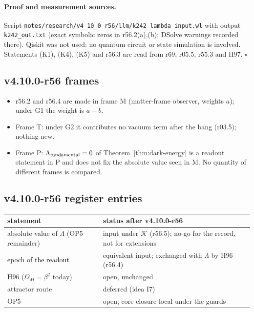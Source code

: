 \paragraph{Proof and measurement sources.}
Script \texttt{notes/\allowbreak research/\allowbreak v4\_10\_0\_r56/\allowbreak llm/\allowbreak k242\_\allowbreak lambda\_\allowbreak input.wl} with output
\texttt{k242\_\allowbreak out.txt} (exact symbolic zeros in r56.2(a),(b); DSolve warnings recorded there).  Qiskit was not used: no quantum circuit or
state simulation is involved.  Statements (K1), (K4), (K5) and r56.3 are read from r69, r05.5, r55.3 and H97.  \(\square\)

\subsection*{v4.10.0-r56 frames}
\label{subsec:v4100-r56-frames}

\begin{itemize}[leftmargin=2em]
\item r56.2 and r56.4 are made in frame M (matter-frame observer, weights \(a\)); under G1 the weight is \(a+b\).
\item Frame T: under G2 it contributes no vacuum term after the bang (r03.5); nothing new.
\item Frame P: \(\Lambda_{\rm fundamental}=0\) of Theorem~\ref{thm:dark-energy} is a readout statement in P and does not fix the absolute value seen in M.
No quantity of different frames is compared.
\end{itemize}

\subsection*{v4.10.0-r56 register entries}
\label{subsec:v4100-r56-register}

\begin{center}
\small
\begin{tabular}{@{}>{\raggedright\arraybackslash}p{}>{\raggedright\arraybackslash}p{}@{}}
\toprule
statement & status after v4.10.0-r56\\
\midrule
absolute value of \(\Lambda\) (OP5 remainder) & input under \(\mathcal K\) (r56.5); no-go for the record, not for extensions\\
epoch of the readout & equivalent input; exchanged with \(\Lambda\) by H96 (r56.4)\\
H96 (\(\Omega_M=\beta^2\) today) & open, unchanged\\
attractor route & deferred (idea I7)\\
OP5 & open; core closure local under the guards\\
\bottomrule
\end{tabular}
\end{center}

